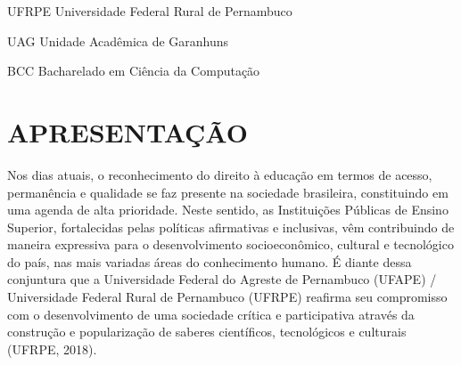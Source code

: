 \documentclass[
	12pt,				%
	openright,			%
  oneside,     %
	a4paper,			%
	chapter=TITLE,		%
	english,			%
	french,				%
	spanish,			%
	brazil				%
	]{abntex2}
\renewcommand{\listtablename}{Lista de quadros}
\begin{document}
\newpage


\frenchspacing 

\listoffigures*
\cleardoublepage

\pdfbookmark[0]{\listtablename}{lot}
\listoftables*
\cleardoublepage

\begin{siglas}
  \item[UFRPE] Universidade Federal Rural de Pernambuco
  \item[UAG] Unidade Acadêmica de Garanhuns
  \item[BCC] Bacharelado em Ciência da Computação
\end{siglas}


\tableofcontents*
\cleardoublepage



\textual


\chapter*{APRESENTAÇÃO}

Nos dias atuais, o reconhecimento do direito à educação em termos de acesso, permanência e qualidade se faz presente na sociedade brasileira, constituindo em uma agenda de alta prioridade. Neste sentido, as Instituições Públicas de Ensino Superior, fortalecidas pelas políticas afirmativas e inclusivas, vêm contribuindo de maneira expressiva para o desenvolvimento socioeconômico, cultural e tecnológico do país, nas mais variadas áreas do conhecimento humano. É diante dessa conjuntura que a Universidade Federal do Agreste de Pernambuco (UFAPE) / Universidade Federal Rural de Pernambuco (UFRPE) reafirma seu compromisso com o desenvolvimento de uma sociedade crítica e participativa através da construção e popularização de saberes científicos, tecnológicos e culturais (UFRPE, 2018).
\end{document}
